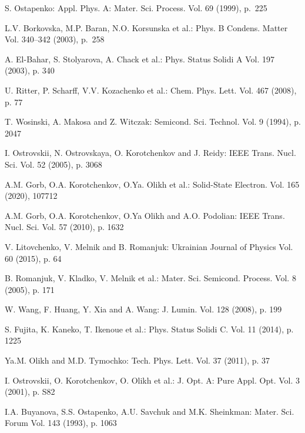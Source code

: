 \documentclass{ttp}
\begin{document}
\begin{thebibliography}{99}

 S. Ostapenko: Appl. Phys. A: Mater. Sci. Process. Vol. 69 (1999), p.~225


 L.V. Borkovska, M.P. Baran, N.O. Korsunska et al.: Phys. B Condens. Matter Vol. 340–342 (2003), p.~258

 A. El-Bahar, S. Stolyarova, A. Chack et al.: Phys. Status Solidi A Vol. 197 (2003), p. 340

 U. Ritter, P. Scharff, V.V. Kozachenko et al.: Chem. Phys. Lett. Vol. 467 (2008), p. 77

 T. Wosinski, A. Makosa and Z. Witczak: Semicond. Sci. Technol. Vol. 9 (1994), p. 2047

 I. Ostrovskii, N. Ostrovskaya, O. Korotchenkov and J. Reidy: IEEE Trans. Nucl. Sci. Vol. 52 (2005), p. 3068


 A.M. Gorb, O.A. Korotchenkov, O.Ya. Olikh et al.: Solid-State Electron. Vol. 165 (2020), 107712

 A.M. Gorb, O.A. Korotchenkov, O.Ya Olikh and A.O. Podolian: IEEE Trans. Nucl. Sci. Vol. 57 (2010), p. 1632

 V. Litovchenko, V. Melnik and B. Romanjuk: Ukrainian Journal of Physics Vol. 60 (2015), p. 64

 B. Romanjuk, V. Kladko, V. Melnik et al.: Mater. Sci. Semicond. Process. Vol. 8 (2005), p. 171

 W. Wang, F. Huang, Y. Xia and A. Wang: J. Lumin. Vol. 128 (2008), p. 199

 S. Fujita, K. Kaneko, T. Ikenoue et al.: Phys. Status Solidi C. Vol. 11 (2014), p. 1225

 Ya.M. Olikh  and  M.D. Tymochko: Tech. Phys. Lett. Vol. 37 (2011), p. 37

 I. Ostrovskii, O. Korotchenkov, O. Olikh et al.: J. Opt. A: Pure Appl. Opt. Vol. 3 (2001), p. S82

 I.A. Buyanova, S.S. Ostapenko, A.U. Savchuk and M.K. Sheinkman: Mater. Sci. Forum Vol. 143 (1993), p. 1063


\end{thebibliography}
\end{document}
